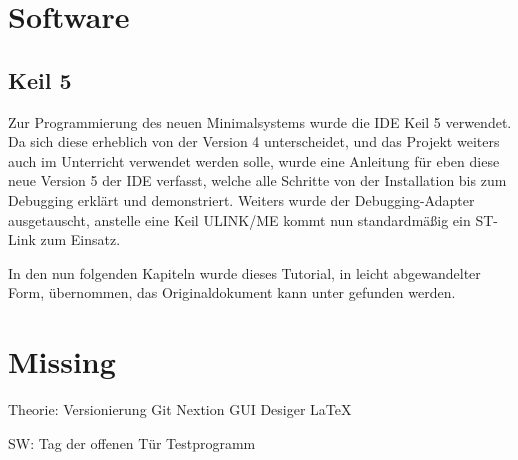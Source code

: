 \section{Software}
\label{sec:software}
\subsection{Keil \uVision{} 5}
\label{sec:uvision-5}
Zur Programmierung des neuen \gls{Minimalsystem}s wurde die \gls{IDE} Keil \uVision{} 5 verwendet. Da sich diese erheblich von der Version 4 unterscheidet, und das Projekt weiters auch im Unterricht verwendet werden solle, wurde eine Anleitung für eben diese neue Version 5 der \gls{IDE} verfasst, welche alle Schritte von der Installation bis zum \gls{Debugging} erklärt und demonstriert. Weiters wurde der \gls{Debugging}-Adapter ausgetauscht, anstelle eine \gls{Keil} ULINK/ME kommt nun standardmäßig ein ST-Link zum Einsatz.

In den nun folgenden Kapiteln wurde dieses Tutorial, in leicht abgewandelter Form, übernommen, das Originaldokument kann unter \cite{doku:tutorial} gefunden werden.





\section{Missing}
Theorie:
Versionierung
Git
Nextion GUI Desiger
LaTeX

SW:
Tag der offenen Tür
Testprogramm